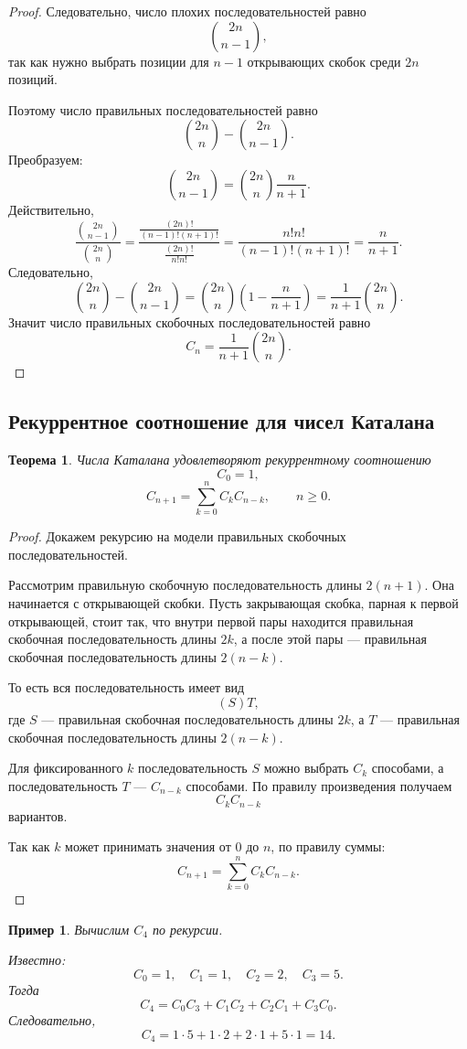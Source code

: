 \documentclass[12pt,a4paper]{article}
\newtheorem{theorem}{Теорема}
\newtheorem{example}{Пример}
\begin{document}
\begin{proof}
Следовательно, число плохих последовательностей равно
\[
\binom{2n}{n-1},
\]
так как нужно выбрать позиции для $n-1$ открывающих скобок среди $2n$ позиций.

Поэтому число правильных последовательностей равно
\[
\binom{2n}{n}-\binom{2n}{n-1}.
\]
Преобразуем:
\[
\binom{2n}{n-1}
=
\binom{2n}{n}\frac{n}{n+1}.
\]
Действительно,
\[
\frac{\binom{2n}{n-1}}{\binom{2n}{n}}
=
\frac{\frac{(2n)!}{(n-1)!(n+1)!}}{\frac{(2n)!}{n!n!}}
=
\frac{n!n!}{(n-1)!(n+1)!}
=
\frac{n}{n+1}.
\]
Следовательно,
\[
\binom{2n}{n}-\binom{2n}{n-1}
=
\binom{2n}{n}\left(1-\frac{n}{n+1}\right)
=
\frac{1}{n+1}\binom{2n}{n}.
\]
Значит число правильных скобочных последовательностей равно
\[
C_n=\frac{1}{n+1}\binom{2n}{n}.
\]
\end{proof}

\subsection{Рекуррентное соотношение для чисел Каталана}

\begin{theorem}
Числа Каталана удовлетворяют рекуррентному соотношению
\[
C_0=1,
\]
\[
C_{n+1}=\sum_{k=0}^{n}C_kC_{n-k},\qquad n\ge 0.
\]
\end{theorem}

\begin{proof}
Докажем рекурсию на модели правильных скобочных последовательностей.

Рассмотрим правильную скобочную последовательность длины $2(n+1)$. Она начинается с открывающей скобки. Пусть закрывающая скобка, парная к первой открывающей, стоит так, что внутри первой пары находится правильная скобочная последовательность длины $2k$, а после этой пары --- правильная скобочная последовательность длины $2(n-k)$.

То есть вся последовательность имеет вид
\[
(S)T,
\]
где $S$ --- правильная скобочная последовательность длины $2k$, а $T$ --- правильная скобочная последовательность длины $2(n-k)$.

Для фиксированного $k$ последовательность $S$ можно выбрать $C_k$ способами, а последовательность $T$ --- $C_{n-k}$ способами. По правилу произведения получаем
\[
C_kC_{n-k}
\]
вариантов.

Так как $k$ может принимать значения от $0$ до $n$, по правилу суммы:
\[
C_{n+1}=\sum_{k=0}^{n}C_kC_{n-k}.
\]
\end{proof}

\begin{example}
Вычислим $C_4$ по рекурсии.

Известно:
\[
C_0=1,\quad C_1=1,\quad C_2=2,\quad C_3=5.
\]
Тогда
\[
C_4=C_0C_3+C_1C_2+C_2C_1+C_3C_0.
\]
Следовательно,
\[
C_4=1\cdot 5+1\cdot 2+2\cdot 1+5\cdot 1=14.
\]
\end{example}
\end{document}
